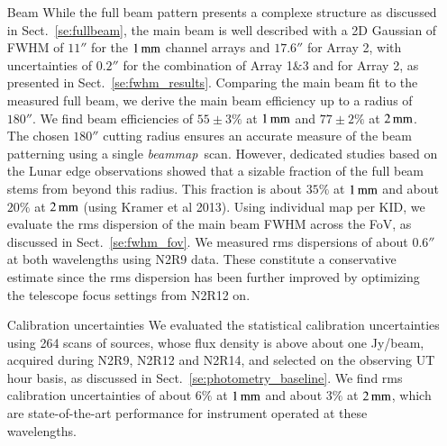\documentclass{aa}
\newcommand{\bm}{\emph{beammap}}
\begin{document}
\begin{enumerate}
\item[Beam] While the full beam pattern presents a complexe structure as discussed
  in Sect.~\ref{se:fullbeam}, the main beam is well described with a 2D
  Gaussian of FWHM of $11''$ for the $1\,\rm{mm}$ channel arrays
  and $17.6''$ for Array 2, with uncertainties of  $0.2''$ for the
  combination of Array 1$\&$3 and for Array 2, as presented in
  Sect.~\ref{se:fwhm_results}.
  Comparing the main beam fit to the measured full beam, we derive the
  main beam efficiency up to a radius of $180''$. We find beam
  efficiencies of $55 \pm 3 \%$ at $1\,\rm{mm}$ and $77 \pm 2 \%$ at
  $2\,\rm{mm}$. %
  The chosen $180''$ cutting radius ensures an accurate
  measure of the beam patterning using a single \bm\ scan. However,
  dedicated studies based on the Lunar edge observations showed that
  a sizable fraction of the full beam stems from beyond this
  radius. This fraction is about $35\%$ at $1\,\rm{mm}$ and about $20\%$
  at $2\,\rm{mm}$ (using Kramer et al 2013). Using individual map per
  KID, we evaluate the rms dispersion of the main beam FWHM across the
  FoV, as discussed in Sect.~\ref{se:fwhm_fov}. We measured rms
  dispersions of about $0.6''$ at both wavelengths using N2R9 data. These
  constitute a conservative estimate since the rms dispersion has been
  further improved by optimizing the telescope focus settings from N2R12
  on.  

\item[Calibration uncertainties] We evaluated the statistical calibration uncertainties using 264 
  scans of sources, whose flux density is above about one Jy/beam,
  acquired during N2R9, N2R12 and N2R14, and selected on the observing UT hour basis, as discussed in
  Sect.~\ref{se:photometry_baseline}. We find rms calibration
  uncertainties of about $6\%$ at $1\,\rm{mm}$ and about $3\%$ at
  $2\,\rm{mm}$, which are state-of-the-art performance for instrument
  operated at these wavelengths. 
  


\end{enumerate}
\end{document}
